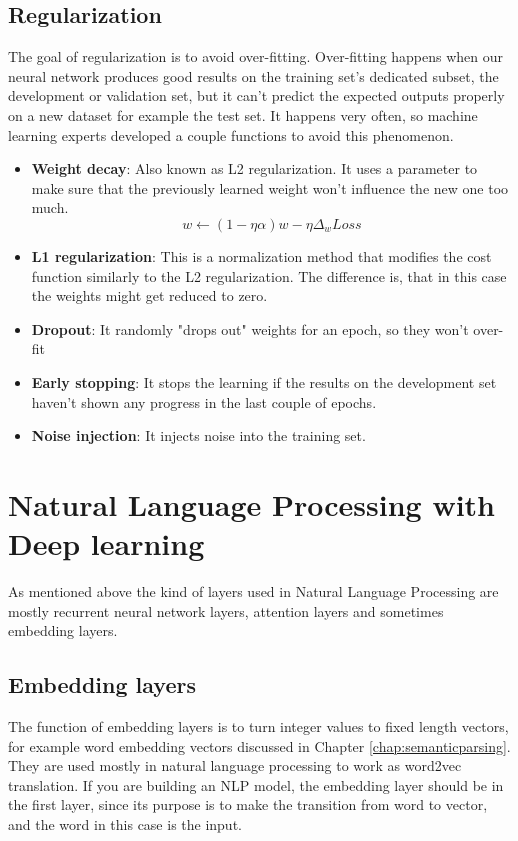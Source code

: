 \subsection{Regularization}
The goal of regularization is to avoid over-fitting. Over-fitting happens when our neural network produces good results on the training set's dedicated subset, the development or validation set, but it can't predict the expected outputs properly on a new dataset for example the test set. It happens very often, so machine learning experts developed a couple functions to avoid this phenomenon.
\begin{itemize}
	\item \textbf{Weight decay}: Also known as L2 regularization. It uses a parameter to make sure that the previously learned weight won't influence the new one too much. \[w \leftarrow (1 - \eta \alpha)w - \eta \Delta_w Loss\]
	\item \textbf{L1 regularization}: This is a normalization method that modifies the cost function similarly to the L2 regularization. The difference is, that in this case the weights might get reduced to zero.
	\item \textbf{Dropout}: It randomly "drops out" weights for an epoch, so they won't over-fit
	\item \textbf{Early stopping}: It stops the learning if the results on the development set haven't shown any progress in the last couple of epochs.
	\item \textbf{Noise injection}: It injects noise into the training set.
\end{itemize}

\section{Natural Language Processing with Deep learning}
As mentioned above the kind of layers used in Natural Language Processing are mostly recurrent neural network layers, attention layers and sometimes embedding layers.

\subsection{Embedding layers}

The function of embedding layers is to turn integer values to fixed length vectors, for example word embedding vectors discussed in Chapter \ref{chap:semanticparsing}. They are used mostly in natural language processing to work as word2vec translation. If you are building an NLP model, the embedding layer should be in the first layer, since its purpose is to make the transition from word to vector, and the word in this case is the input.

